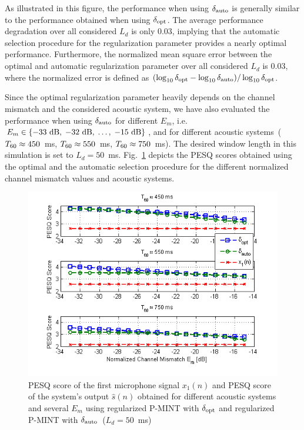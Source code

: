 \documentclass[10pt]{IEEEtran}
\begin{document}
As illustrated in this figure, the performance when using $\delta_{\rm auto}$ is generally similar to the performance obtained when using $\delta_{\rm opt}$.
The average performance degradation over all considered $L_d$ is only $0.03$, implying that the automatic selection procedure for the regularization parameter provides a nearly optimal performance.
Furthermore, the normalized mean square error between the optimal and automatic regularization parameter over all considered $L_d$ is $0.03$, where the normalized error is defined as $(\log_{10}\delta_{\rm opt} - \log_{10}\delta_{\rm auto})/\log_{10}\delta_{\rm opt}$.

Since the optimal regularization parameter heavily depends on the channel mismatch and the considered acoustic system, we have also evaluated the performance when using $\delta_{\rm auto}$ for different $E_m$, i.e. $E_m \in \{ -33~{\rm dB}, \; -32~{\rm dB}, \; \ldots, \; -15~{\rm dB} \}$, and for different acoustic systems~($T_{\rm 60} \approx 450$~ms, $T_{\rm 60} \approx 550$~ms, $T_{\rm 60} \approx 750$~ms).
The desired window length in this simulation is set to $L_d = 50$~ms.
Fig.~\ref{fig: autopesq2} depicts the PESQ scores obtained using the optimal and the automatic selection procedure for the different normalized channel mismatch values and acoustic systems.
\begin{figure}[b!]
\centering
\includegraphics[scale = 0.57]{Plots/auto_reg_Ld50_severalEm}
\caption{PESQ score of the first microphone signal $x_1(n)$ and PESQ score of the system's output $\hat{s}(n)$ obtained for different acoustic systems and several $E_m$ using regularized P-MINT with $\delta_{\rm opt}$ and regularized P-MINT with $\delta_{\rm auto}$~($L_d = 50$~ms)}
\label{fig: autopesq2}
\end{figure}
\end{document}
